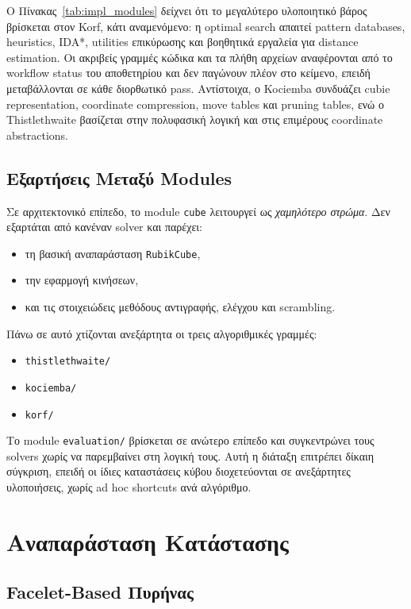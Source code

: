 Ο Πίνακας~\ref{tab:impl_modules} δείχνει ότι το μεγαλύτερο υλοποιητικό βάρος βρίσκεται στον Korf, κάτι αναμενόμενο: η optimal search απαιτεί pattern databases, heuristics, IDA*, utilities επικύρωσης και βοηθητικά εργαλεία για distance estimation. Οι ακριβείς γραμμές κώδικα και τα πλήθη αρχείων αναφέρονται από το workflow status του αποθετηρίου και δεν παγώνουν πλέον στο κείμενο, επειδή μεταβάλλονται σε κάθε διορθωτικό pass. Αντίστοιχα, ο Kociemba συνδυάζει cubie representation, coordinate compression, move tables και pruning tables, ενώ ο Thistlethwaite βασίζεται στην πολυφασική λογική και στις επιμέρους coordinate abstractions.

\subsection{Εξαρτήσεις Μεταξύ Modules}

Σε αρχιτεκτονικό επίπεδο, το module \texttt{cube} λειτουργεί ως \emph{χαμηλότερο στρώμα}. Δεν εξαρτάται από κανέναν solver και παρέχει:
\begin{itemize}
    \item τη βασική αναπαράσταση \texttt{RubikCube},
    \item την εφαρμογή κινήσεων,
    \item και τις στοιχειώδεις μεθόδους αντιγραφής, ελέγχου και scrambling.
\end{itemize}

Πάνω σε αυτό χτίζονται ανεξάρτητα οι τρεις αλγοριθμικές γραμμές:
\begin{itemize}
    \item \texttt{thistlethwaite/}
    \item \texttt{kociemba/}
    \item \texttt{korf/}
\end{itemize}

Το module \texttt{evaluation/} βρίσκεται σε ανώτερο επίπεδο και συγκεντρώνει τους solvers χωρίς να παρεμβαίνει στη λογική τους. Αυτή η διάταξη επιτρέπει δίκαιη σύγκριση, επειδή οι ίδιες καταστάσεις κύβου διοχετεύονται σε ανεξάρτητες υλοποιήσεις, χωρίς ad hoc shortcuts ανά αλγόριθμο.

\section{Αναπαράσταση Κατάστασης}

\subsection{Facelet-Based Πυρήνας}

